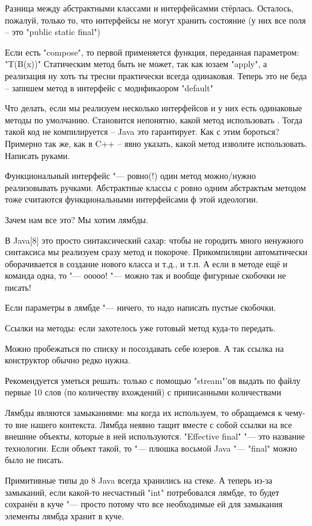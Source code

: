 Разница между абстрактными классами и интерфейсамми стёрлась. Осталось, пожалуй, только то, что интерфейсы не могут хранить состояние
(у них все поля -- это \java"public static final")

Если есть \java"compose", то первой применяется функция, переданная параметром: \java"T(B(x))"
Статическим метод быть не может, так как юзаем \java"apply", а реализация ну хоть ты тресни практически всегда одинаковая.
Теперь это не беда -- запишем метод в интерфейс с модификаором \java"default"

Что делать, если мы реализуем несколько интерфейсов и у них есть одинаковые методы по умолчанию.
Становится непонятно, какой метод использовать%
.
Тогда такой код не компилируется -- Java это гарантирует.
Как с этим бороться? Примерно так же, как в C++ -- явно указать, какой метод изволите использовать. Написать руками.

Функциональный интерфейс "--- ровно(!) один метод можно/нужно реализовывать ручками.
Абстрактные классы с ровно одним абстрактым методом тоже считаются функциональными интерфейсами ф этой идеологии.

Зачем нам все это? Мы хотим лямбды.

В Java[8] это просто синтаксический сахар: чтобы не городить много ненужного синтаксиса мы реализуем сразу метод и покороче.
Прикомпиляции автоматически оборачивается в создание нового класса и т.д., и т.п.
А если в методе ещё и команда одна, то "---  ооооо! "--- можно так и вообще фигурные скобочки не писать!

Если параметры в лямбде "--- ничего, то надо написать пустые скобочки.

Ссылки на методы: если захотелось уже готовый метод куда-то передать.

Можно пробежаться по списку и посоздавать себе юзеров. А так ссылка на конструктор обычно редко нужна.


Рекомендуется уметься решать: только с помощью \java"stream"'ов выдать по файлу первые 10 слов
(по количеству вхождений) с приписанными количествами

Лямбды являются замыканиями: мы когда их используем, то обращаемся к чему-то вне нашего контекста.
Лямбда неявно тащит вместе с собой ссылки на все внешние объекты, которые в ней используются.%
\java"Effective final" "--- это название технологии. Если объект такой, то "--- плюшка восьмой Java "--- 
\java"final" можно было не писать.

Примитивные типы до 8 Java всегда хранились на стеке. А теперь из-за замыканий, если какой-то несчастный \java"int" потребовался
лямбде, то будет сохранён в куче "--- просто потому что все необходимые ей для замыкания элементы лямбда хранит в куче.
